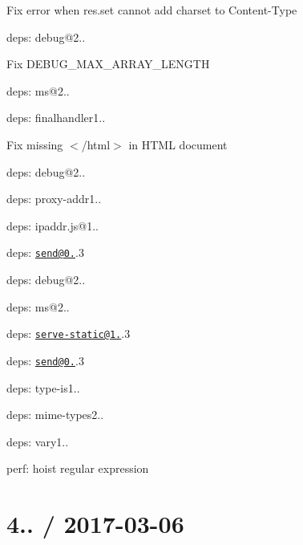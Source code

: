 \begin{DoxyItemize}
\item Fix error when {\ttfamily res.\+set} cannot add charset to {\ttfamily Content-\/\+Type}
\item deps\+: debug@2..
\begin{DoxyItemize}
\item Fix {\ttfamily D\+E\+B\+U\+G\+\_\+\+M\+A\+X\+\_\+\+A\+R\+R\+A\+Y\+\_\+\+L\+E\+N\+G\+TH}
\item deps\+: ms@2..
\end{DoxyItemize}
\item deps\+: finalhandler1..
\begin{DoxyItemize}
\item Fix missing {\ttfamily $<$/html$>$} in H\+T\+ML document
\item deps\+: debug@2..
\end{DoxyItemize}
\item deps\+: proxy-\/addr1..
\begin{DoxyItemize}
\item deps\+: ipaddr.\+js@1..
\end{DoxyItemize}
\item deps\+: \href{mailto:send@0.15}{\tt send@0.}.3
\begin{DoxyItemize}
\item deps\+: debug@2..
\item deps\+: ms@2..
\end{DoxyItemize}
\item deps\+: \href{mailto:serve-static@1.12}{\tt serve-\/static@1.}.3
\begin{DoxyItemize}
\item deps\+: \href{mailto:send@0.15}{\tt send@0.}.3
\end{DoxyItemize}
\item deps\+: type-\/is1..
\begin{DoxyItemize}
\item deps\+: mime-\/types2..
\end{DoxyItemize}
\item deps\+: vary1..
\begin{DoxyItemize}
\item perf\+: hoist regular expression
\end{DoxyItemize}
\end{DoxyItemize}

\section*{4.. / 2017-\/03-\/06 }


